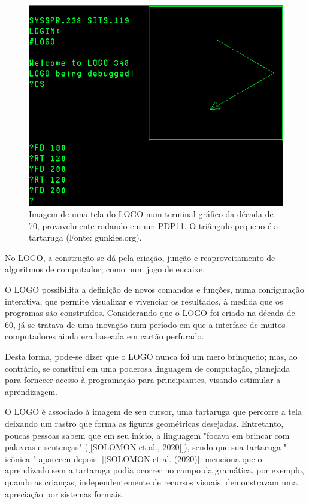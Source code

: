 \begin{figure}[p]
\begin{minipage}[b]{0.4\linewidth}
                \includegraphics[width=1.0\linewidth]{../../../imagens/logo-PDP11.png}
                \caption{Imagem de uma tela do LOGO num terminal gráfico da década de 70, provavelmente rodando em um PDP11. O triângulo pequeno é a tartaruga (Fonte: gunkies.org).}
                \label{ca83b217b58f57e503ff496c6c6f47bee5dc77cd}
\end{minipage}
\hspace{0.5cm}
\end{figure}



No LOGO, a construção se dá pela criação, junção e reaproveitamento de algoritmos de computador, como num jogo de encaixe.

O LOGO possibilita a definição de novos comandos e funções, numa configuração interativa, que permite visualizar e vivenciar os resultados, à medida que os programas são construídos. Considerando que o LOGO foi criado na década de 60, já se tratava de uma inovação num período em que a interface de muitos computadores ainda era baseada em cartão perfurado.

Desta forma, pode-se dizer que o LOGO nunca foi um mero brinquedo; mas, ao contrário, se constitui em uma poderosa linguagem de computação, planejada para fornecer acesso à programação para principiantes, visando estimular a aprendizagem.

O LOGO é associado à imagem de seu cursor, uma tartaruga que percorre a tela deixando um rastro que forma as figuras geométricas desejadas. Entretanto, poucas pessoas sabem que em seu início, a linguagem "focava em brincar com palavras e sentenças" ([[SOLOMON et al., 2020]]), sendo que sua tartaruga " icônica " apareceu depois.  [[SOLOMON et al. (2020)]] menciona que o aprendizado sem a tartaruga podia ocorrer no campo da gramática, por exemplo, quando as crianças, independentemente de recursos visuais, demonstravam uma apreciação por sistemas formais.

